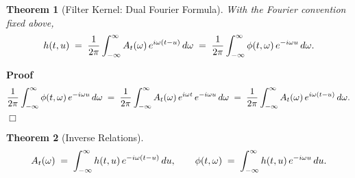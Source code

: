 \documentclass{article}
\newenvironment{proof}{\noindent\textbf{Proof\ }}{\hspace*{\fill}$\Box$\medskip}
\newtheorem{theorem}{Theorem}
\begin{document}
\begin{theorem}[Filter Kernel: Dual Fourier Formula]
  With the Fourier convention fixed above,
  \[ h (t, u) \hspace{0.27em} = \hspace{0.27em} \frac{1}{2 \pi}  \int_{-
     \infty}^{\infty} A_t (\omega)  \hspace{0.17em} e^{i \omega (t - u)} 
     \hspace{0.17em} d \omega \hspace{0.27em} = \hspace{0.27em} \frac{1}{2
     \pi}  \int_{- \infty}^{\infty} \phi (t, \omega)  \hspace{0.17em} e^{- i
     \omega u}  \hspace{0.17em} d \omega . \]
\end{theorem}

\begin{proof}
  \[ \frac{1}{2 \pi}  \int_{- \infty}^{\infty} \phi (t, \omega) 
     \hspace{0.17em} e^{- i \omega u}  \hspace{0.17em} d \omega
     \hspace{0.27em} = \hspace{0.27em} \frac{1}{2 \pi}  \int_{-
     \infty}^{\infty} A_t (\omega)  \hspace{0.17em} e^{i \omega t} 
     \hspace{0.17em} e^{- i \omega u}  \hspace{0.17em} d \omega
     \hspace{0.27em} = \hspace{0.27em} \frac{1}{2 \pi}  \int_{-
     \infty}^{\infty} A_t (\omega)  \hspace{0.17em} e^{i \omega (t - u)} 
     \hspace{0.17em} d \omega . \]
\end{proof}

\begin{theorem}[Inverse Relations]
  \begin{equation}
    A_t (\omega) \hspace{0.27em} = \hspace{0.27em} \int_{- \infty}^{\infty} h
    (t, u)  \hspace{0.17em} e^{- i \omega (t - u)}  \hspace{0.17em} du, \qquad
    \phi (t, \omega) \hspace{0.27em} = \hspace{0.27em} \int_{-
    \infty}^{\infty} h (t, u)  \hspace{0.17em} e^{- i \omega u} 
    \hspace{0.17em} du.
  \end{equation}
\end{theorem}
\end{document}
